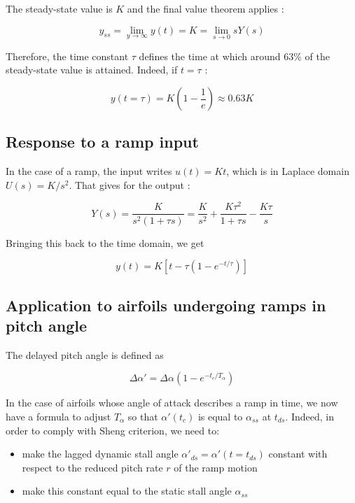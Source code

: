 \noindent The steady-state value is $K$ and the final value theorem applies : 

\begin{equation}
y_{ss} = \lim_{y \rightarrow \infty} y(t) = K = \lim_{s \rightarrow 0} sY(s)
\end{equation}

Therefore, the time constant $\tau$ defines the time at which around 63\% of the steady-state value is attained. Indeed, if $t=\tau$ : 

\begin{equation}
y(t=\tau) = K(1-\frac{1}{e}) \approx 0.63K 
\end{equation}

\subsection{Response to a ramp input}
\label{section:ramp_input}

In the case of a ramp, the input writes $u(t) = Kt$, which is in Laplace domain $U(s) = K/s^2$. That gives for the output : 

\begin{equation}
Y(s) = \frac{K}{s^2(1+\tau s)} = \frac{K}{s^2} + \frac{K \tau^2}{1+\tau s} - \frac{K \tau}{s}
\end{equation}

Bringing this back to the time domain, we get 

\begin{equation}
y(t) = K \left[ t - \tau(1-e^{-t/\tau})\right]
\label{ramp time response}
\end{equation}

\subsection{Application to airfoils undergoing ramps in pitch angle}

The delayed pitch angle is defined as 

\begin{equation}
\Delta \alpha' = \Delta \alpha (1-e^{-t_c/T_\alpha})
\end{equation}

In the case of airfoils whose angle of attack describes a ramp in time, we now have a formula to adjust $T_\alpha$ so that $\alpha'(t_c)$ is equal to $\alpha_{ss}$ at $t_{ds}$. Indeed, in order to comply with Sheng criterion, we need to:

\begin{itemize}
\item make the lagged dynamic stall angle $\alpha'_{ds} = \alpha'(t=t_{ds})$ constant with respect to the reduced pitch rate $r$ of the ramp motion
\item make this constant equal to the static stall angle $\alpha_{ss}$
\end{itemize}


